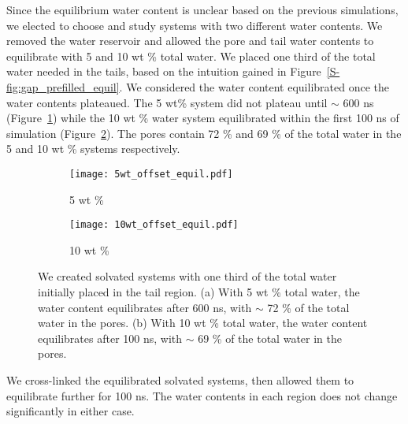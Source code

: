   Since the equilibrium water content is unclear based on the previous
  simulations, we elected to choose and study systems with two different water
  contents. We removed the water reservoir and allowed the pore and tail water
  contents to equilibrate with 5 and 10 wt \% total water. We placed one third of
  the total water needed in the tails, based on the intuition gained in
  Figure~\ref{S-fig:gap_prefilled_equil}. We considered the water content
  equilibrated once the water contents plateaued. The 5 wt\% system did
  not plateau until $\sim$ 600 ns (Figure~\ref{S-fig:5wt_offset_equil})
  while the 10 wt \% water system equilibrated within the first 100 ns of 
  simulation (Figure~\ref{S-fig:10wt_offset_equil}).
  The pores contain 72 \% and 69 \% of the total water in the 5 and 10 wt \%
  systems respectively.
  \clearpage
  \begin{figure}[!htb]
  \centering
  \begin{subfigure}{0.45\textwidth}
  \texttt{[image: 5wt\_offset\_equil.pdf]}
  \caption{5 wt \%}\label{S-fig:5wt_offset_equil}
  \end{subfigure}
  \begin{subfigure}{0.45\textwidth}
  \texttt{[image: 10wt\_offset\_equil.pdf]}
  \caption{10 wt \%}\label{S-fig:10wt_offset_equil}
  \end{subfigure}
  \caption{We created solvated systems with one third of the total water
	  initially placed in the tail region. (a) With 5 wt \% total water, the water
	  content equilibrates after 600 ns, with $\sim$ 72 \% of the total water in the
	  pores. (b) With 10 wt \% total water, the water content equilibrates after 100
	  ns, with $\sim$ 69 \% of the total water in the
	  pores.}\label{S-fig:solvation_equilibration}
  \end{figure}

  We cross-linked the equilibrated solvated systems, then allowed them to 
  equilibrate further for 100 ns. The water contents in each region does not
  change significantly in either case.

